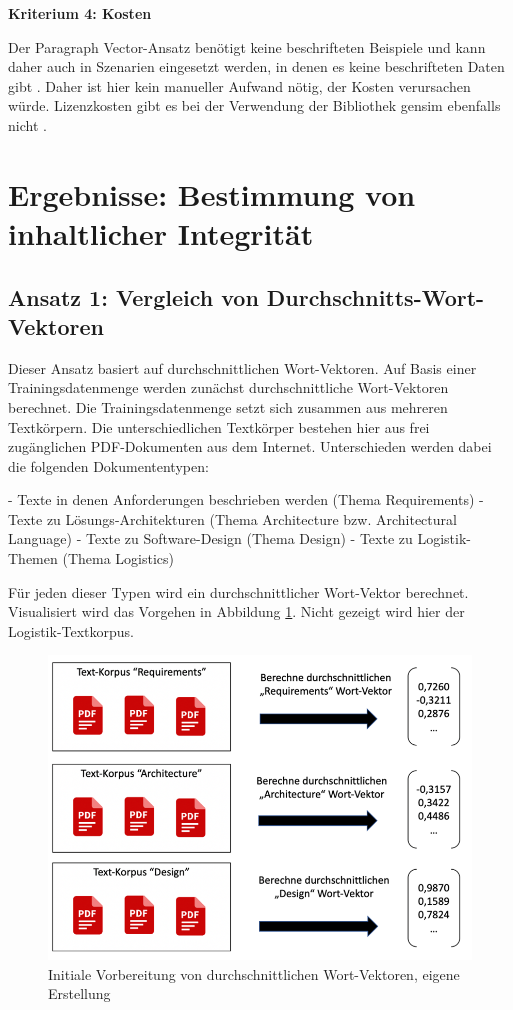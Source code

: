 {\bf Kriterium 4: Kosten}

Der Paragraph Vector-Ansatz benötigt keine beschrifteten Beispiele und kann daher auch in Szenarien eingesetzt werden, in denen es keine beschrifteten Daten gibt \cite[S. 4]{mikolov2014}. Daher ist hier kein manueller Aufwand nötig, der Kosten verursachen würde. Lizenzkosten gibt es bei der Verwendung der Bibliothek gensim ebenfalls nicht \cite{gensim-license}.

\section{Ergebnisse: Bestimmung von inhaltlicher Integrität}

\subsection{Ansatz 1: Vergleich von Durchschnitts-Wort-Vektoren}

Dieser Ansatz basiert auf durchschnittlichen Wort-Vektoren. Auf Basis einer Trainingsdatenmenge werden zunächst durchschnittliche Wort-Vektoren berechnet. Die Trainingsdatenmenge setzt sich zusammen aus mehreren Textkörpern. Die unterschiedlichen Textkörper bestehen hier aus frei zugänglichen PDF-Dokumenten aus dem Internet. Unterschieden werden dabei die folgenden Dokumententypen:

-	Texte in denen Anforderungen beschrieben werden (Thema Requirements)
-	Texte zu Lösungs-Architekturen (Thema Architecture bzw. Architectural Language)
-	Texte zu Software-Design (Thema Design) 
-	Texte zu Logistik-Themen (Thema Logistics)

Für jeden dieser Typen wird ein durchschnittlicher Wort-Vektor berechnet. Visualisiert wird das Vorgehen in Abbildung \ref{Abbildung:avgvec}. Nicht gezeigt wird hier der Logistik-Textkorpus.

\begin{figure}[h]
\centering
\includegraphics[scale=0.95]{content/pics/Picture_16.png}
\caption{Initiale Vorbereitung von durchschnittlichen Wort-Vektoren, eigene Erstellung}
\label{Abbildung:avgvec}
\end{figure}

